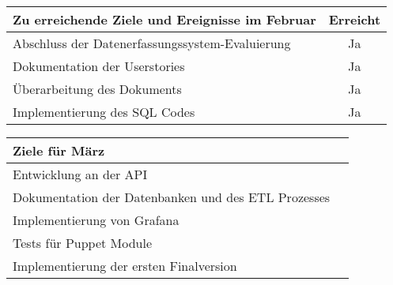 \begin{tabularx}{\textwidth}{Xc}
    \arrayrulecolor{OliveGreen}
    \toprule
    {\bfseries Zu erreichende Ziele und Ereignisse im Februar} & {\bfseries Erreicht} \\
    \midrule[2pt]
    Abschluss der Datenerfassungssystem\hyp{}Evaluierung      &Ja                    \\
    \rowcolor{OliveGreen!15}
    Dokumentation der Userstories                             &Ja                    \\
    \rowcolor{White}
    Überarbeitung des Dokuments         &Ja                    \\
    \rowcolor{OliveGreen!15}
    Implementierung des SQL Codes                            &Ja                    \\
    \bottomrule[2pt]
\end{tabularx}
%
\vspace{1cm}
%
\begin{tabularx}{\textwidth}{Xc}
    \arrayrulecolor{OliveGreen}
    \toprule
    {\bfseries Ziele für März}                         &                      \\
    \midrule[2pt]
    Entwicklung an der API &                      \\
    \rowcolor{OliveGreen!15}
    Dokumentation der Datenbanken und des ETL Prozesses  &                      \\
    \rowcolor{White}
    Implementierung von Grafana                       &                      \\
    \rowcolor{OliveGreen!15}
    Tests für Puppet Module                     &                      \\
    \rowcolor{White}
    Implementierung der ersten Finalversion & \\
\end{tabularx}
